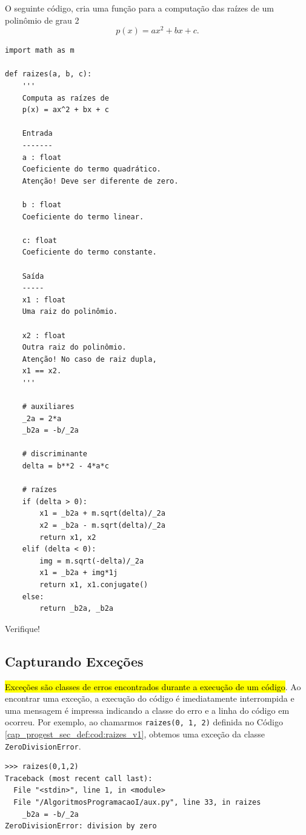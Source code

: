 \begin{ex}
  O seguinte código, cria uma função para a computação das raízes de um polinômio de grau 2
  \begin{equation}
    p(x) = ax^2 + bx + c.
  \end{equation}

\begin{lstlisting}[caption=raizes\_v1.py, label=cap_progest_sec_def:cod:raizes_v1]
import math as m

def raizes(a, b, c):
    '''
    Computa as raízes de
    p(x) = ax^2 + bx + c

    Entrada
    -------
    a : float
    Coeficiente do termo quadrático.
    Atenção! Deve ser diferente de zero.

    b : float 
    Coeficiente do termo linear.

    c: float
    Coeficiente do termo constante.

    Saída
    -----
    x1 : float
    Uma raiz do polinômio.

    x2 : float
    Outra raiz do polinômio.
    Atenção! No caso de raiz dupla,
    x1 == x2.
    '''

    # auxiliares
    _2a = 2*a
    _b2a = -b/_2a

    # discriminante
    delta = b**2 - 4*a*c

    # raízes
    if (delta > 0):
        x1 = _b2a + m.sqrt(delta)/_2a
        x2 = _b2a - m.sqrt(delta)/_2a
        return x1, x2
    elif (delta < 0):
        img = m.sqrt(-delta)/_2a
        x1 = _b2a + img*1j
        return x1, x1.conjugate()
    else:
        return _b2a, _b2a
\end{lstlisting}
  
Verifique!
\end{ex}

\subsection{Capturando Exceções}

\hl{Exceções são classes de erros encontrados durante a execução de um código}. Ao encontrar uma exceção, a execução do código {\python} é imediatamente interrompida e uma mensagem é impressa indicando a classe do erro e a linha do código em ocorreu. Por exemplo, ao chamarmos \lstinline+raizes(0, 1, 2)+ definida no Código \ref{cap_progest_sec_def:cod:raizes_v1}, obtemos uma exceção da classe \lstinline+ZeroDivisionError+.

\begin{lstlisting}
>>> raizes(0,1,2)
Traceback (most recent call last):
  File "<stdin>", line 1, in <module>
  File "/AlgoritmosProgramacaoI/aux.py", line 33, in raizes
    _b2a = -b/_2a
ZeroDivisionError: division by zero
\end{lstlisting}

